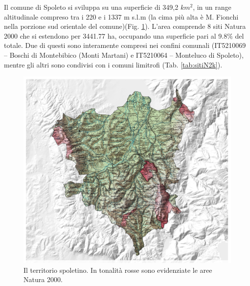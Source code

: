 \documentclass[
]{book}
\begin{document}
Il comune di Spoleto si sviluppa su una superficie di 349,2 \(km^2\), in un range altitudinale compreso tra i 220 e i 1337 m s.l.m (la cima più alta è M. Fionchi nella porzione sud orientale del comune)(Fig. \ref{fig:cartaSpoleto}).
L'area comprende 8 siti Natura 2000 che si estendono per 3441.77 ha, occupando una superficie pari al 9.8\% del totale.
Due di questi sono interamente compresi nei confini comunali (IT5210069 -- Boschi di Montebibico (Monti Martani) e IT5210064 -- Monteluco di Spoleto), mentre gli altri sono condivisi con i comuni limitrofi (Tab. \ref{tab:sitiN2k}).

\begin{figure}

{\centering \includegraphics[width=\linewidth]{./figs/RECSpoleto_map01} 

}

\caption{Il territorio spoletino. In tonalità rosse sono evidenziate le aree Natura 2000.}\label{fig:cartaSpoleto}
\end{figure}
\end{document}
